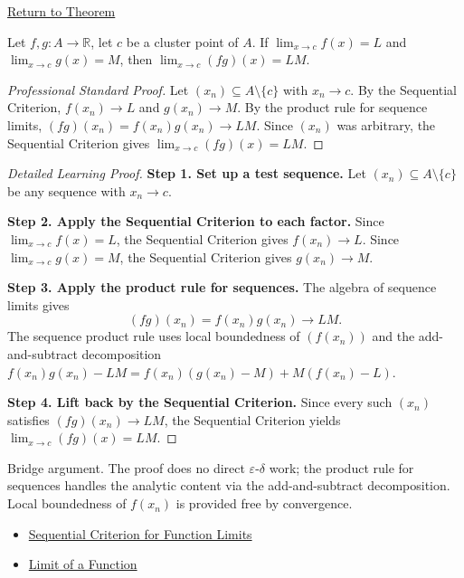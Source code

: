 \newpage
{}
\label{prf:limit-product}

\begin{remark*}[Return]
\hyperref[thm:limit-product]{Return to Theorem}
\end{remark*}

\begin{theorem*}
Let $f, g : A \to \mathbb{R}$, let $c$ be a cluster point of $A$. If
$\lim_{x\to c}f(x)=L$ and $\lim_{x\to c}g(x)=M$, then
$\lim_{x\to c}(fg)(x) = LM$.
\end{theorem*}

\begin{proof}[Professional Standard Proof]
\LRAProofBodyStart
Let $(x_n) \subseteq A \setminus \{c\}$ with $x_n \to c$.
By the Sequential Criterion, $f(x_n) \to L$ and $g(x_n) \to M$.
By the product rule for sequence limits, $(fg)(x_n) = f(x_n)g(x_n) \to LM$.
Since $(x_n)$ was arbitrary, the Sequential Criterion gives
$\lim_{x\to c}(fg)(x) = LM$.
\end{proof}

\begin{proof}[Detailed Learning Proof]
\LRAProofBodyStart
\textbf{Step 1. Set up a test sequence.}
Let $(x_n) \subseteq A \setminus \{c\}$ be any sequence with $x_n \to c$.

\textbf{Step 2. Apply the Sequential Criterion to each factor.}
Since $\lim_{x\to c}f(x)=L$, the Sequential Criterion gives $f(x_n) \to L$.
Since $\lim_{x\to c}g(x)=M$, the Sequential Criterion gives $g(x_n) \to M$.

\textbf{Step 3. Apply the product rule for sequences.}
The algebra of sequence limits gives
\[
  (fg)(x_n) = f(x_n)g(x_n) \to LM.
\]
The sequence product rule uses local boundedness of $(f(x_n))$ and the
add-and-subtract decomposition
$f(x_n)g(x_n) - LM = f(x_n)(g(x_n)-M) + M(f(x_n)-L)$.

\textbf{Step 4. Lift back by the Sequential Criterion.}
Since every such $(x_n)$ satisfies $(fg)(x_n) \to LM$, the Sequential
Criterion yields $\lim_{x\to c}(fg)(x) = LM$.
\end{proof}

\begin{remark*}
Bridge argument. The proof does no direct $\varepsilon$-$\delta$ work; the
product rule for sequences handles the analytic content via the
add-and-subtract decomposition. Local boundedness of $f(x_n)$ is provided
free by convergence.
\end{remark*}

\begin{dependencies}
\begin{itemize}
  \item \hyperref[prop:sequential-criterion-limits]{Sequential Criterion for Function Limits}
  \item \hyperref[def:limit-function]{Limit of a Function}
\end{itemize}
\end{dependencies}

\clearpage
